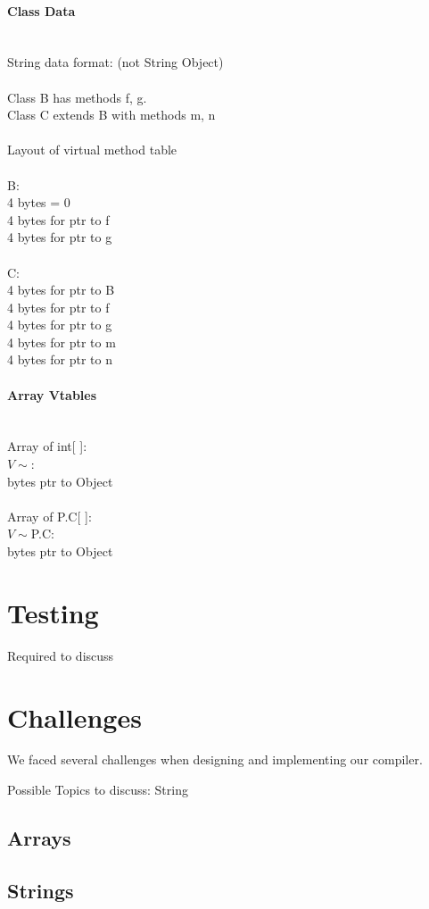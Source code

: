 \documentclass[12pt, a4paper]{article}
\begin{document}
\paragraph{Class Data\\}
\noindent \\
String data format: (not String Object) \\
\\
Class B has methods f, g. \\
Class C extends B with methods m, n \\
\\
Layout of virtual method table \\
\\
B: \\
4 bytes = 0 \\
4 bytes for ptr to f \\
4 bytes for ptr to g \\
\\
C: \\
4 bytes for ptr to B \\
4 bytes for ptr to f \\
4 bytes for ptr to g \\
4 bytes for ptr to m \\
4 bytes for ptr to n 

\paragraph{Array Vtables\\}
\noindent \\
Array of int[ ]: \\
$V\sim$\textdollar@int: \\
 bytes ptr to Object \\
\\
Array of P.C[ ]: \\
$V\sim$\textdollar P.C: \\
 bytes ptr to Object

\section{Testing}

Required to discuss

\section{Challenges}

We faced several challenges when designing and implementing our compiler.

Possible Topics to discuss:
String
\subsection{Arrays}

\subsection{Strings}
\end{document}
